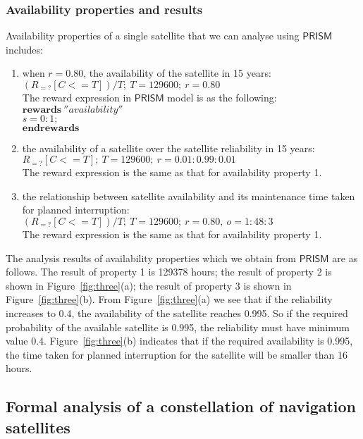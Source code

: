 \documentclass[preprint,12pt]{qrei}
\begin{document}
\subsubsection{Availability properties and results}

Availability properties of a single satellite that we can analyse using $\mathsf{PRISM}$ includes:

\begin{enumerate}
\item when $r=0.80$, the availability of the satellite in 15 years:\\
$(R_{=?}[C<=T ])/T;\ T=129600;\ r=0.80$\\
The reward expression in $\mathsf{PRISM}$ model is as the following:\\
$\textbf{rewards}\ ''availability''$\\
$s = 0 : 1;$\\
$\textbf{endrewards}$
\item the availability of a satellite over the satellite reliability in 15 years:\\
$R_{=?}[C<=T];\ T=129600;\ r=0.01:0.99:0.01$\\
The reward expression is the same as that for availability property 1.
\item the relationship between satellite availability and its maintenance time taken for planned interruption:\\
$(R_{=?}[C<=T])/T;\ T=129600;\ r=0.80,\ o=1:48:3$\\
The reward expression is the same as that for availability property 1.
\end{enumerate}

The analysis results of availability properties which we obtain from $\mathsf{PRISM}$ are as follows. The result of property 1 is 129378 hours; the result of property 2 is shown in Figure~\ref{fig:three}(a); the result of property 3 is shown in Figure~\ref{fig:three}(b). From Figure~\ref{fig:three}(a) we see that if the reliability increases to 0.4, the availability of the satellite reaches 0.995. So if the required probability of the available satellite is 0.995, the reliability must have minimum value 0.4. Figure~\ref{fig:three}(b) indicates that if the required availability is 0.995, the time taken for planned interruption for the satellite will be smaller than 16 hours.


\subsection{Formal analysis of a constellation of navigation satellites}
\end{document}
